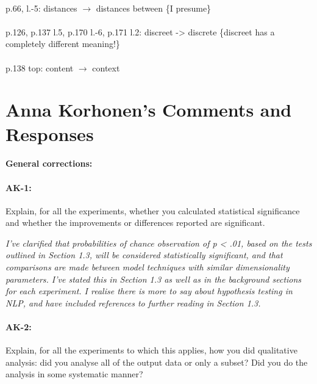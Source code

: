 \documentclass[11pt,a4paper]{article}
\newcommand{\res}[1]{\vspace{0.25cm} \begin{adjustwidth}{1cm}{}\emph{#1}\end{adjustwidth}}
\begin{document}
\paragraph{} p.66, l.-5: distances $\rightarrow$ distances between \{I presume\}

\paragraph{} p.126,   p.137 l.5,   p.170 l.-6,   p.171 l.2: discreet -> discrete \{discreet has a completely different meaning!\}

\paragraph{} p.138 top: content $\rightarrow$ context 


\section{Anna Korhonen's Comments and Responses}

\paragraph{General corrections:}

\paragraph{AK-1:} Explain, for all the experiments, whether you calculated statistical significance and whether the improvements or differences reported are significant.

\res{I've clarified that probabilities of chance observation of p < .01, based on the tests outlined in Section 1.3, will be considered statistically significant, and that comparisons are made between model techniques with similar dimensionality parameters.  I've stated this in Section 1.3 as well as in the background sections for each experiment.  I realise there is more to say about hypothesis testing in NLP, and have included references to further reading in Section 1.3.}

\paragraph{AK-2:} Explain, for all the experiments to which this applies, how you did qualitative analysis: did you analyse all of the output data or only a subset? Did you do the analysis in some systematic manner?
\end{document}
